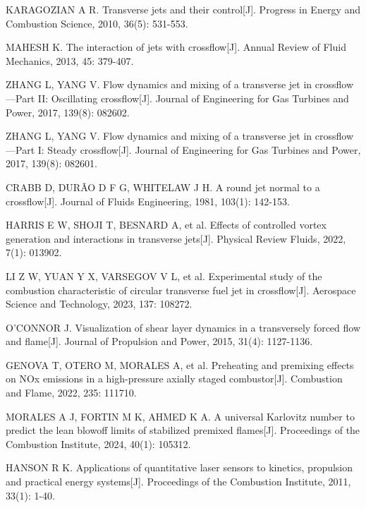 \documentclass[UTF8,a4paper,zihao=-4,fontset=windows]{ctexart}
\newcommand{\hthree}[1]{\par\vspace{0.8ex}\noindent{\bfseries #1}\par\vspace{0.4ex}}
\begin{document}
\hthree{参考资料}
\vspace{0.3\baselineskip}\par
{\linespread{1.25}\selectfont
\setlength{\parindent}{0pt}
\begin{enumerate}[label={[\arabic*]}, leftmargin=2.2em,
  labelsep=0.2em, itemsep=0pt, parsep=0pt, topsep=2pt, partopsep=0pt]
\item KARAGOZIAN A R. Transverse jets and their control[J]. Progress in Energy and Combustion Science, 2010, 36(5): 531-553.
\item MAHESH K. The interaction of jets with crossflow[J]. Annual Review of Fluid Mechanics, 2013, 45: 379-407.
\item ZHANG L, YANG V. Flow dynamics and mixing of a transverse jet in crossflow—Part II: Oscillating crossflow[J]. Journal of Engineering for Gas Turbines and Power, 2017, 139(8): 082602.
\item ZHANG L, YANG V. Flow dynamics and mixing of a transverse jet in crossflow—Part I: Steady crossflow[J]. Journal of Engineering for Gas Turbines and Power, 2017, 139(8): 082601.
\item CRABB D, DURÃO D F G, WHITELAW J H. A round jet normal to a crossflow[J]. Journal of Fluids Engineering, 1981, 103(1): 142-153.
\item HARRIS E W, SHOJI T, BESNARD A, et al. Effects of controlled vortex generation and interactions in transverse jets[J]. Physical Review Fluids, 2022, 7(1): 013902.
\item LI Z W, YUAN Y X, VARSEGOV V L, et al. Experimental study of the combustion characteristic of circular transverse fuel jet in crossflow[J]. Aerospace Science and Technology, 2023, 137: 108272.
\item O'CONNOR J. Visualization of shear layer dynamics in a transversely forced flow and flame[J]. Journal of Propulsion and Power, 2015, 31(4): 1127-1136.
\item GENOVA T, OTERO M, MORALES A, et al. Preheating and premixing effects on NOx emissions in a high-pressure axially staged combustor[J]. Combustion and Flame, 2022, 235: 111710.
\item MORALES A J, FORTIN M K, AHMED K A. A universal Karlovitz number to predict the lean blowoff limits of stabilized premixed flames[J]. Proceedings of the Combustion Institute, 2024, 40(1): 105312.
\item HANSON R K. Applications of quantitative laser sensors to kinetics, propulsion and practical energy systems[J]. Proceedings of the Combustion Institute, 2011, 33(1): 1-40.

\end{enumerate}}
\end{document}
